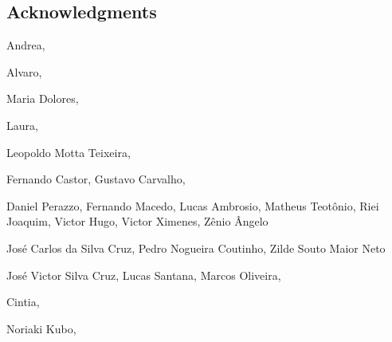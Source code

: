 \thispagestyle{empty}
\begin{spacing}{1.0}
\chapter*{Acknowledgments}

Andrea,

Alvaro,

Maria Dolores,

Laura,

Leopoldo Motta Teixeira,

Fernando Castor, Gustavo Carvalho,

Daniel Perazzo, Fernando Macedo, Lucas Ambrosio, Matheus Teotônio, Riei Joaquim, Victor Hugo, Victor Ximenes, Zênio Ângelo

José Carlos da Silva Cruz, Pedro Nogueira Coutinho, Zilde Souto Maior Neto

José Victor Silva Cruz, Lucas Santana, Marcos Oliveira,

Cintia,

Noriaki Kubo,
    
\clearpage
\end{spacing}